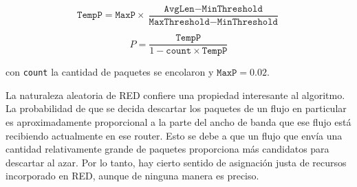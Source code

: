 \[
    \texttt{TempP} = \texttt{MaxP}\times\frac{\texttt{AvgLen} - \texttt{MinThreshold}}{\texttt{MaxThreshold} - \texttt{MinThreshold}}
\]

\[
  P = \frac{\texttt{TempP}}{1 - \texttt{count}\times\texttt{TempP}}
\]

con \texttt{count} la cantidad de paquetes se encolaron y \(\texttt{MaxP} = 0.02\).

La naturaleza aleatoria de RED confiere una propiedad interesante al algoritmo. La probabilidad de que se decida descartar los paquetes de un flujo en particular es aproximadamente proporcional a la parte del ancho de banda que ese flujo está recibiendo actualmente en ese router. Esto se debe a que un flujo que envía una cantidad relativamente grande de paquetes proporciona más candidatos para descartar al azar. Por lo tanto, hay cierto sentido de asignación justa de recursos incorporado en RED, aunque de ninguna manera es preciso.
